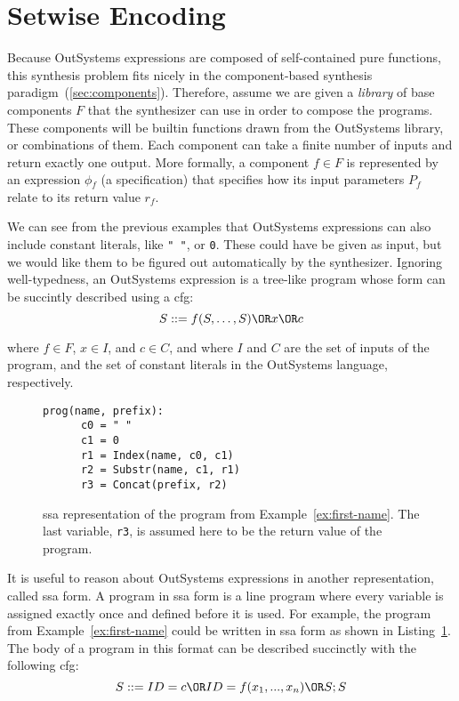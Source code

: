 \section{Setwise Encoding}
\label{sec:setwise-encoding}

Because OutSystems expressions are composed of self-contained pure functions,
this synthesis problem fits nicely in the component-based synthesis
paradigm~(\ref{sec:components}). Therefore, assume we are given a \textit{library}
of base components $F$ that the synthesizer can use in order to compose the
programs. These components will be builtin functions drawn from the OutSystems
library, or combinations of them. Each component can take a finite number of
inputs and return exactly one output. More formally, a component $f \in F$ is
represented by an expression $\phi{}_f$ (a specification) that specifies how its
input parameters $P_f$ relate to its return value $r_f$.

We can see from the previous examples that OutSystems expressions can also
include constant literals, like \lstinline{" "}, or \lstinline{0}. These could
have be given as input, but we would like them to be figured out automatically
by the synthesizer. Ignoring well-typedness, an OutSystems expression is a
tree-like program whose form can be succintly described using a \gls{cfg}:
%
\[S ::= f(S, \ldots, S) \OR x \OR c\]

\noindent
where $f \in F$, $x \in I$, and $c \in C$, and where $I$ and $C$ are the set of
inputs of the program, and the set of constant literals in the OutSystems
language, respectively.

\begin{figure}
  \begin{lstlisting}[frame=tlrb]
    prog(name, prefix):
      c0 = " "
      c1 = 0
      r1 = Index(name, c0, c1)
      r2 = Substr(name, c1, r1)
      r3 = Concat(prefix, r2)
  \end{lstlisting}
\caption{\gls{ssa} representation of the program from
    Example~\ref{ex:first-name}. The last variable, \lstinline{r3}, is assumed
    here to be the return value of the program.}
\label{fig:first-name-ssa}
\end{figure}

It is useful to reason about OutSystems expressions in another representation,
called \gls{ssa} form. A program in \gls{ssa} form is a line program where every
variable is assigned exactly once and defined before it is used. For example,
the program from Example~\ref{ex:first-name} could be written in \gls{ssa} form
as shown in Listing~\ref{fig:first-name-ssa}. The body of a program in this
format can be described succinctly with the following \gls{cfg}:
%
\[S ::= ID = c \OR ID = f(x_1, ..., x_n) \OR S;S\]

